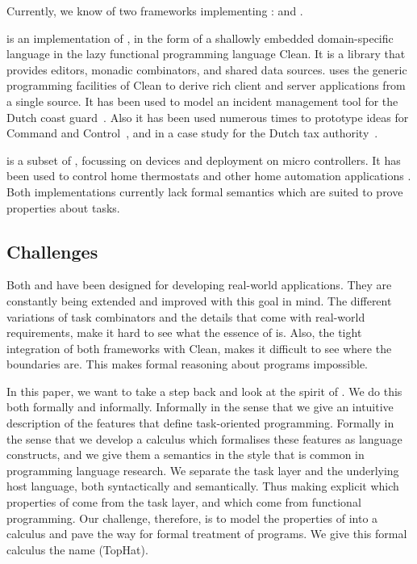 Currently, we know of two frameworks implementing \TOP: \ITASKS and \MTASKS.

\ITASKS is an implementation of \TOP, in the form of a shallowly embedded domain-specific language in the lazy functional programming language Clean.
It is a library that provides editors, monadic combinators, and shared data sources.
\ITASKS uses the generic programming facilities of Clean to derive rich client and server applications from a single source.
It has been used to model an incident management tool for the Dutch coast guard~\cite{conf/iscram/LijnseJP12}.
Also it has been used numerous times to prototype ideas for Command and Control~\cite{theses/nlda/Kool17, theses/radboud/Stutterheim17}, and in a case study for the Dutch tax authority~\cite{conf/sfp/StutterheimAP17}.

\MTASKS is a subset of \ITASKS,
focussing on \IOT devices and deployment on micro controllers.
It has been used to control home thermostats and other home automation applications \cite{koopman2018task}.
%
Both implementations currently lack formal semantics which are suited to prove properties about tasks.



\subsection{Challenges}

Both \ITASKS and \MTASKS have been designed for developing real-world applications.
They are constantly being extended and improved with this goal in mind.
The different variations of task combinators and the details that come with real-world requirements,
make it hard to see what the essence of \TOP is.
Also, the tight integration of both frameworks with Clean, makes it difficult to see where the boundaries are.
This makes formal reasoning about \TOP programs impossible.

In this paper, we want to take a step back and look at the spirit of \TOP.
We do this both formally and informally.
Informally in the sense that we give an intuitive description of the features that define task-oriented programming.
Formally in the sense that we develop a calculus which formalises these features as language constructs,
and we give them a semantics in the style that is common in programming language research.
We separate the task layer and the underlying host language, both syntactically and semantically.
Thus making explicit which properties of \TOP come from the task layer, and which come from functional programming.
Our challenge, therefore, is to model the properties of \TOP into a calculus
and pave the way for formal treatment of \TOP programs.
We give this formal calculus the name \TOPHAT (TopHat).



